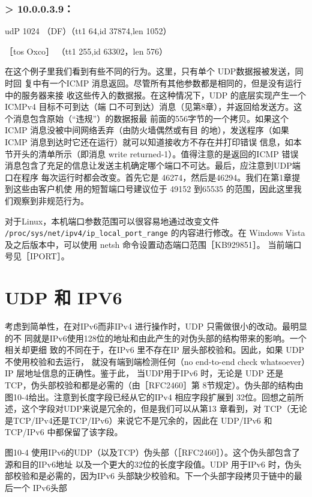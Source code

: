\subsubsection{> 10.0.0.3.9：}
udP 1024 （DF）（tt1 64,id 37874,len 1052）

［tos Oxco］ （tt1 255,id 63302，len 576）

在这个例子里我们看到有些不同的行为。这里，只有单个 UDP数据报被发送，同时回
复中有一个ICMP 消息返回。尽管所有其他参数都是相同的，但是没有运行中的服务器来接
收这些传入的数据报。在这种情况下，UDP 的底层实现产生一个 ICMPv4 目标不可到达（端
口不可到达）消息（见第8章），并返回给发送方。这个消息包含原始（“违规”）的数据报最
前面的556字节的一个拷贝。如果这个ICMP 消息没被中间网络丢弃（由防火墙偶然或有目
的地），发送程序（如果ICMP 消息到达时它还在运行）就可以知道接收方不存在并打印错误
信息，如本节开头的清单所示（即消息 write returned-1）。值得注意的是返回的ICMP 错误
消息包含了充足的信息让发送主机确定哪个端口不可达。最后，应注意到UDP端口在程序
每次运行时都会改变。首先它是 46274，然后是46294。我们在第1章提到这些由客户机使
用的短暂端口号建议位于 49152 到65535 的范围，因此这里我们观察到非规范行为。

\begin{tcolorbox}
    对于Linux，本机端口参数范围可以很容易地通过改变文件 \verb|/proc/sys/net/ipv4/ip_local_port_range|
    的内容进行修改。在 Windows Vista及之后版本中，可以使用 netsh 命令设置动态端口范围［KB929851］。
    当前端口号见［IPORT］。
\end{tcolorbox}

\section{UDP 和 IPV6}
考虑到简单性，在对IPv6而非IPv4 进行操作时，UDP 只需做很小的改动。最明显的不
同就是IPv6使用128位的地址和由此产生的对伪头部的结构带来的影响。一个相关却更细
致的不同在于，在IPv6 里不存在IP 层头部校验和。因此，如果 UDP 不使用校验和去运行，
就没有端到端检测任何（no end-to-end check whatsoever）IP 层地址信息的正确性。鉴于此，
当UDP用于IPv6 时，无论是 UDP 还是TCP，伪头部校验和都是必需的（由［RFC2460］第
8节规定）。伪头部的结构由图10-4给出。注意到长度字段已经从它的IPv4 相应字段扩展到
32位。回想之前所述，这个字段对UDP来说是冗余的，但是我们可以从第13 章看到，对
TCP（无论是TCP/IPv4还是TCP/IPv6）来说它不是冗余的，因此在 UDP/IPv6 和 TCP/IPv6
中都保留了该字段。

图10-4 使用IPv6的UDP（以及TCP）伪头部（［RFC2460］）。这个伪头部包含了源和目的IPv6地址
以及一个更大的32位的长度字段值。UDP 用于IPv6 时，伪头部校验和是必需的，因为IPv6
头部缺少校验和。下一个头部字段拷贝于链中的最后一个 IPv6头部


